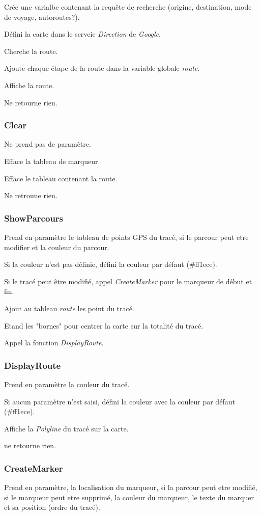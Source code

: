 \documentclass[a4paper]{article}
\begin{document}
Crée une varialbe contenant la requête de recherche (origine, destination, mode de voyage, autoroutes?).

Défini la carte dans le servcie \emph{Direction} de \emph{Google}.

Cherche la route.

Ajoute chaque étape de la route dans la variable globale \emph{route}.

Affiche la route.

Ne retourne rien.

\subsubsection{Clear}
Ne prend pas de paramètre.

Efface la tableau de marqueur.

Efface le tableau contenant la route.

Ne retroune rien.

\subsubsection{ShowParcours}
Prend en paramètre le tableau de points GPS du tracé, si le parcour peut etre modifier et la couleur du parcour.

Si la couleur n'est pas définie, défini la couleur par défaut (\#ff1ece).

Si le tracé peut être modifié, appel \emph{CreateMarker} pour le marqueur de début et fin.

Ajout au tableau \emph{route} les point du tracé.

Etand les "bornes" pour centrer la carte sur la totalité du tracé.

Appel la fonction \emph{DisplayRoute}.

\subsubsection{DisplayRoute}
Prend en paramètre la couleur du tracé.

Si aucun paramètre n'est saisi, défini la couleur avec la couleur par défaut (\#ff1ece).

Affiche la \emph{Polyline} du tracé sur la carte.

ne retourne rien.

\subsubsection{CreateMarker}
Prend en paramètre, la localisation du marqueur, si la parcour peut etre modifié, si le marqueur peut etre supprimé, la couleur du marqueur, le texte du marquer et sa position (ordre du tracé).
\end{document}
